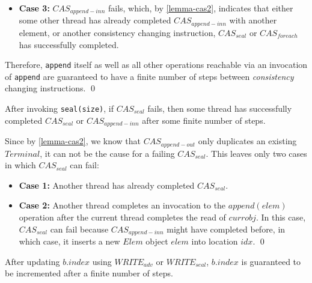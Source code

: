 \begin{prooftwo}
\begin{itemize}
\item \textbf{Case 3:} $CAS_{append-inn}$ fails, which, by
\ref{lemma-cas2}, indicates that either some other thread has already completed
$CAS_{append-inn}$ with another element, or another consistency changing
instruction, $CAS_{seal}$ or $CAS_{foreach}$ has successfully completed.

\end{itemize}

Therefore, \verb=append= itself as well as all other operations reachable via an
invocation of \verb=append= are guaranteed to have a finite number of steps between
\textit{consistency} changing instructions.
\qed
\end{prooftwo}



\begin{lemmatwo}\label{lemma-cas5}
After invoking \verb=seal(size)=, if $CAS_{seal}$ fails, then some thread has
successfully completed $CAS_{seal}$ or $CAS_{append-inn}$ after some finite number of steps.
\end{lemmatwo}

\begin{prooftwo} Since by \ref{lemma-cas2}, we know that $CAS_{append-out}$
only duplicates an existing $Terminal$, it can not be the cause for a failing
$CAS_{seal}$. This leaves only two cases in which $CAS_{seal}$ can fail:

\begin{itemize}
\item \textbf{Case 1:} Another thread has already completed $CAS_{seal}$.
\item \textbf{Case 2:} Another thread completes an invocation to the
$append(elem)$ operation after the current thread completes the read of
$currobj$. In this  case, $CAS_{seal}$ can fail because $CAS_{append-inn}$
might have  completed before, in which case, it inserts a new $Elem$ object
$elem$  into location $idx$.
\qed
\end{itemize}
\end{prooftwo}


\begin{lemmatwo}\label{lemma-write2-write3}
After updating $b.index$ using $WRITE_{adv}$ or $WRITE_{seal}$,  $b.index$ is guaranteed
to be incremented after a finite number of steps.
\end{lemmatwo}

